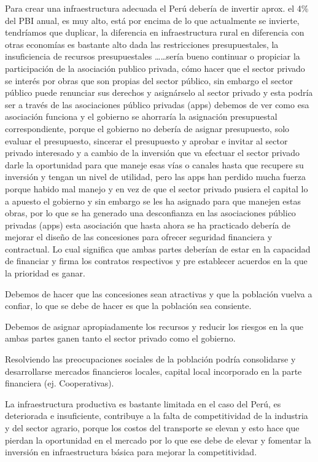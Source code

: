 \documentclass[
  a4paper,
]{article}
\begin{document}
Para crear una infraestructura adecuada el Perú debería de invertir
aprox. el 4\% del PBI anual, es muy alto, está por encima de lo que
actualmente se invierte, tendríamos que duplicar, la diferencia en
infraestructura rural en diferencia con otras economías es bastante alto
dada las restricciones presupuestales, la insuficiencia de recursos
presupuestales \ldots\ldots sería bueno continuar o propiciar la
participación de la asociación publico privada, cómo hacer que el sector
privado se interés por obras que son propias del sector público, sin
embargo el sector público puede renunciar sus derechos y asignárselo al
sector privado y esta podría ser a través de las asociaciones público
privadas (apps) debemos de ver como esa asociación funciona y el
gobierno se ahorraría la asignación presupuestal correspondiente, porque
el gobierno no debería de asignar presupuesto, solo evaluar el
presupuesto, sincerar el presupuesto y aprobar e invitar al sector
privado interesado y a cambio de la inversión que va efectuar el sector
privado darle la oportunidad para que maneje esas vías o canales hasta
que recupere su inversión y tengan un nivel de utilidad, pero las apps
han perdido mucha fuerza porque habido mal manejo y en vez de que el
sector privado pusiera el capital lo a apuesto el gobierno y sin embargo
se les ha asignado para que manejen estas obras, por lo que se ha
generado una desconfianza en las asociaciones público privadas (apps)
esta asociación que hasta ahora se ha practicado debería de mejorar el
diseño de las concesiones para ofrecer seguridad financiera y
contractual. Lo cual significa que ambas partes deberían de estar en la
capacidad de financiar y firma los contratos respectivos y pre
establecer acuerdos en la que la prioridad es ganar.

Debemos de hacer que las concesiones sean atractivas y que la población
vuelva a confiar, lo que se debe de hacer es que la población sea
consiente.

Debemos de asignar apropiadamente los recursos y reducir los riesgos en
la que ambas partes ganen tanto el sector privado como el gobierno.

Resolviendo las preocupaciones sociales de la población podría
consolidarse y desarrollarse mercados financieros locales, capital local
incorporado en la parte financiera (ej. Cooperativas).

La infraestructura productiva es bastante limitada en el caso del Perú,
es deteriorada e insuficiente, contribuye a la falta de competitividad
de la industria y del sector agrario, porque los costos del transporte
se elevan y esto hace que pierdan la oportunidad en el mercado por lo
que ese debe de elevar y fomentar la inversión en infraestructura básica
para mejorar la competitividad.
\end{document}
